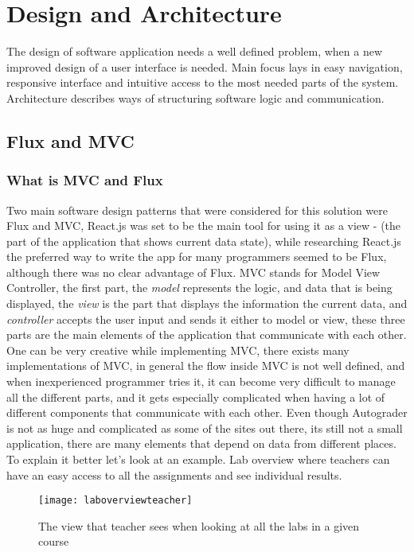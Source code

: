 \chapter{Design and Architecture}

The design of software application needs a well defined problem, when a new improved design of a user interface is needed. Main focus lays in easy navigation, responsive interface and intuitive access to the most needed parts of the system. Architecture describes ways of structuring software logic and communication.

\section{Flux and MVC}\label{sec:fluxmvc}
\subsection{What is MVC and Flux}
Two main software design patterns that were considered for this solution were Flux and MVC, React.js was set to be the main tool for using it as a view - (the part of the application that shows current data state), while researching React.js the preferred way to write the app for many programmers seemed to be Flux, although there was no clear advantage of Flux. MVC stands for Model View Controller, the first part, the \emph{model} represents the logic, and data that is being displayed, the \emph{view} is the part that displays the information the current data, and \emph{controller} accepts the user input and sends it either to model or view, these three parts are the main elements of the application that communicate with each other. One can be very creative while implementing MVC, there exists many implementations of MVC, in general the flow inside MVC is not well defined, and when inexperienced programmer tries it, it can become very difficult to manage all the different parts, and it gets especially complicated when having a lot of different components that communicate with each other. Even though Autograder is not as huge and complicated as some of the sites out there, its still not a small application, there are many elements that depend on data from different places. To explain it better let's look at an example. Lab overview where teachers can have an easy access to all the assignments and see individual results.

\begin{figure}[h]
  {\texttt{[image: laboverviewteacher]}}
  \caption{The view that teacher sees when looking at all the labs in a given course}
  \label{fig:laboverwievteacher}
\end{figure}

